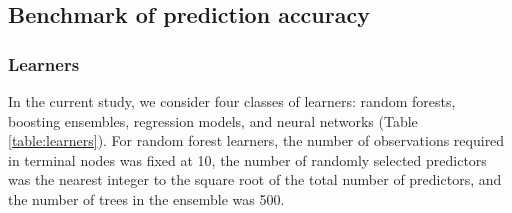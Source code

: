 \documentclass[twoside,11pt]{article}\usepackage[]{graphicx}\usepackage[]{color}
\begin{document}
\subsection{Benchmark of prediction accuracy}

\subsubsection{Learners}

In the current study, we consider four classes of learners: random forests, boosting ensembles, regression models, and neural networks (Table \ref{table:learners}). For random forest learners, the number of observations required in terminal nodes was fixed at 10, the number of randomly selected predictors was the nearest integer to the square root of the total number of predictors, and the number of trees in the ensemble was 500.
\end{document}
